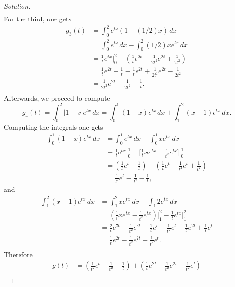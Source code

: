 \documentclass[letterpaper, 10 pt, conference]{article}
\begin{document}
\begin{proof}[Solution]
\begin{align}
	\end{align}
For the third, one gets
	\begin{align}
		g_3 (t) &= \int_{0}^{2} e^{tx} (1 - (1/2) x) \, dx \\
		&= \int_{0}^{2} e^{tx} \, dx - \int_{0}^{2} (1/2) x e^{tx} \, dx \\
		&= \frac{1}{t} e^{tx} \Big\lvert^{2}_{0} - (\frac{1}{t} e^{2t} - \frac{1}{2t^2} e^{2t} + \frac{1}{2t^2}) \\
		&= \frac{1}{t} e^{2t} - \frac{1}{t} - \frac{1}{t} e^{2t} + \frac{1}{2t^2} e^{2t} - \frac{1}{2t^2} \\
		&= \frac{1}{2t^2} e^{2t} - \frac{1}{2t^2} - \frac{1}{t}. \\ 
	\end{align}
Afterwards, we proceed to compute
	\begin{equation}
		g_4 (t) = \int_{0}^{2} |1-x| e^{tx} \, dx = \int_{0}^{1} (1-x) e^{tx} \, dx + \int_{1}^{2} (x-1) e^{tx} \, dx.
	\end{equation}
    Computing the integrals one gets 
    \begin{align}
    	\int_{0}^{1} (1-x) e^{tx} \, dx &= \int_{0}^{1} e^{tx} \, dx - \int_{0}^{1} x e^{tx} \, dx \\
    	&= \frac{1}{t} e^{tx} \Big\lvert^{1}_{0} - \lbrack \frac{1}{t} x e^{tx} - \frac{1}{t^2} e^{tx} \rbrack \Big\lvert^{1}_{0} \\
    	&= (\frac{1}{t} e^{t} - \frac{1}{t}) - (\frac{1}{t} e^{t} - \frac{1}{t^2} e^t + \frac{1}{t^2})\\
    	&= \frac{1}{t^2} e^t - \frac{1}{t^2} - \frac{1}{t}, 
    \end{align}
    and
    \begin{align}
    	\int_{1}^{2} (x-1) e^{tx} \, dx &= \int_{1}^{2} x e^{tx} \, dx - \int_{1}{2} e^{tx} \, dx \\
    	&= (\frac{1}{t} x e^{tx} - \frac{1}{t^2} e^{tx})\Big\lvert^{2}_{1} - \frac{1}{t} e^{tx} \Big\lvert^{2}_{1}\\
    	&= \frac{2}{t} e^{2t} - \frac{1}{t^2} e^{2t} - \frac{1}{t} e^{t} + \frac{1}{t^2} e^{t} - \frac{1}{t} e^{2t} + \frac{1}{t} e^t \\
    	&= \frac{1}{t} e^{2t} - \frac{1}{t^2} e^{2t} + \frac{1}{t^2} e^t. \\
    \end{align}
    Therefore 
    \begin{align}
    	g(t) &= (\frac{1}{t^2} e^t - \frac{1}{t^2} - \frac{1}{t} ) + ( \frac{1}{t} e^{2t} - \frac{1}{t^2} e^{2t} + \frac{1}{t^2} e^t) \\

\end{align}
\end{proof}
\end{document}
